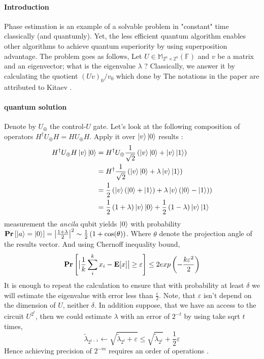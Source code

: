 
\paragraph{Introduction} Phase estimation is an example of a solvable problem in "constant" time classically (and quantumly). Yet, the less efficient quantum algorithm enables other algorithms to achieve quantum superiority by using superposition advantage.
The problem goes as follows, Let \(U \in \mathbb{M}_{2^n \times 2^n }(\mathbb{F})\) and \(v\) be a matrix and an eigenvector; what is the eigenvalue \(\lambda\) ? Classically, we answer it by calculating the quotient \( (Uv)_0/v_0 \) which done by  The notations in the paper are attributed to Kitaev \cite{kitaev}.
\paragraph{quantum solution} Denote by \( U_{\oplus} \) the control-\(U\) gate. Let's look at the following composition of
operators \( H^{\dagger}U_{\oplus}H = HU_{\oplus}H \). Apply it over \( \ket{v}\ket{0} \) results : \begin{equation*} \begin{split}  H^{\dagger}U_{\oplus}H \ket{v}\ket{0} & = H^{\dagger}U_{\oplus} \frac{1}{\sqrt{2}}\left(\ket{v}\ket{0} + \ket{v}\ket{1} \right) \\ & = H^{\dagger} \frac{1}{\sqrt{2}}\left(\ket{v}\ket{0} + \lambda\ket{v}\ket{1} \right) \\ & = \frac{1}{2}\left(\ket{v}\left(\ket{0}+\ket{1}\right)+\lambda\ket{v}\left(\ket{0}-\ket{1}\right)\right) \\ & = \frac{1}{2}\left(1+\lambda\right)\ket{v}\ket{0} + \frac{1}{2}\left(1-\lambda\right)\ket{v}\ket{1} \end{split}\end{equation*}  measurement the \textit{ancila} qubit yields \( \ket{0} \) with probability \( \mathbf{Pr} \left[ { \ket{a} = \ket{0} } \right]  = \big| \frac{ 1 + \lambda}{2} \big|^2 \sim \frac{1}{2}\left( 1 + \cos (\theta) \right)  \). Where \( \theta\) denote the projection angle of the results vector. And using Chernoff inequality bound, \[ \mathbf{Pr} \left[ { \big| \frac{1}{k}\sum_{i}^{k}{x_i} - \mathbf{E}[x] \big| \ge \varepsilon} \right] \le 2exp\left( -\frac{k\varepsilon^2}{2} \right) \] It is enough to repeat the calculation  to ensure that with probability at least \( \delta \) we will estimate the eigenvalue with error less than \( \frac{\varepsilon}{2} \). Note, that  \( \varepsilon \)  isn't  depend on the dimension of \( U \), neither \( \delta \).
In addition suppose, that we have an access to the circuit \( U^{2^t} \), then we could estimate \( \lambda \) with an error of \( 2^{-t} \) by using take sqrt \( t\) times,  \[ \tilde{\lambda}_{2^{t-1}} \leftarrow \sqrt{\tilde{\lambda}_{2^t} + \varepsilon }\le  \sqrt{\tilde{\lambda}_{2^t}} + \frac{1}{2}\varepsilon \]Hence achieving precision of \( 2^{-m} \) requires an order of  operations  .      
